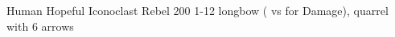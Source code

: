 \filledCS%
  {\currentName}%
  {Human}%
  {Hopeful Iconoclast}%
  {Rebel}%
  {{2}{0}{0}}%
  {{1}{-1}{2}}%
  {%
    \renewcommand\rank{Fodder}
    \renewcommand\characterDebt{100 \glspl{sp}}
    \setcounter{Academics}{2}
    \setcounter{Crafts}{1}
    \setcounter{Empathy}{1}
    \setcounter{Stealth}{2}
    \setcounter{Projectiles}{1}
    \setcounter{equipmentWeight}{1}
    \Dagger
  }%
  {}%
  {longbow {\footnotesize( vs  for  Damage)}, quarrel with 6 arrows}%


